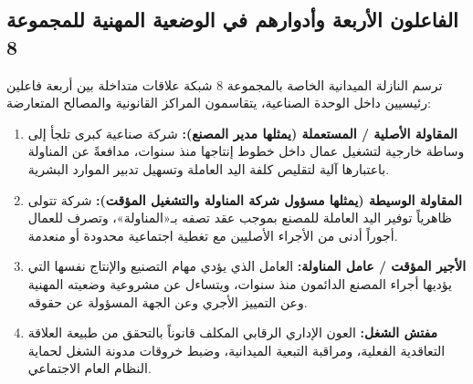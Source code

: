 \subsection{الفاعلون الأربعة وأدوارهم في الوضعية المهنية للمجموعة 8}
ترسم النازلة الميدانية الخاصة بالمجموعة \textenglish{8} شبكة علاقات متداخلة بين أربعة فاعلين رئيسيين داخل الوحدة الصناعية، يتقاسمون المراكز القانونية والمصالح المتعارضة:
\begin{enumerate}[leftmargin=*, itemsep=5pt]
    \item \textbf{المقاولة الأصلية / المستعملة (يمثلها مدير المصنع):} شركة صناعية كبرى تلجأ إلى وساطة خارجية لتشغيل عمال داخل خطوط إنتاجها منذ سنوات، مدافعةً عن المناولة باعتبارها آلية لتقليص كلفة اليد العاملة وتسهيل تدبير الموارد البشرية.
    \item \textbf{المقاولة الوسيطة (يمثلها مسؤول شركة المناولة والتشغيل المؤقت):} شركة تتولى ظاهرياً توفير اليد العاملة للمصنع بموجب عقد تصفه بـ«المناولة»، وتصرف للعمال أجوراً أدنى من الأجراء الأصليين مع تغطية اجتماعية محدودة أو منعدمة.
    \item \textbf{الأجير المؤقت / عامل المناولة:} العامل الذي يؤدي مهام التصنيع والإنتاج نفسها التي يؤديها أجراء المصنع الدائمون منذ سنوات، ويتساءل عن مشروعية وضعيته المهنية وعن التمييز الأجري وعن الجهة المسؤولة عن حقوقه.
    \item \textbf{مفتش الشغل:} العون الإداري الرقابي المكلف قانوناً بالتحقق من طبيعة العلاقة التعاقدية الفعلية، ومراقبة التبعية الميدانية، وضبط خروقات مدونة الشغل لحماية النظام العام الاجتماعي.
\end{enumerate}

